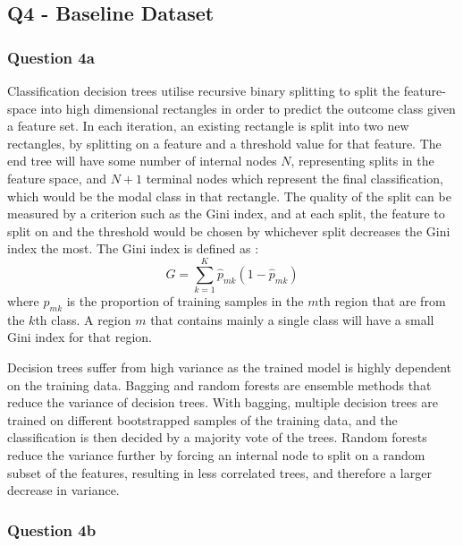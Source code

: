 
\subsection{Q4 - Baseline Dataset}\label{subsec:q4}
\subsubsection{Question 4a}\label{subsubsec:q4a}
    Classification decision trees utilise recursive binary splitting to split the feature-space into high dimensional
    rectangles in order to predict the outcome class given a feature set.
    In each iteration, an existing rectangle is split into two new rectangles, by splitting on a feature and a threshold
    value for that feature.
    The end tree will have some number of internal nodes $N$, representing splits in the feature space, and $N + 1$
    terminal nodes which represent the final classification, which would be the modal class in that rectangle.
    The quality of the split can be measured by a criterion such as the Gini index, and at each split, the feature to
    split on and the threshold would be chosen by whichever split decreases the Gini index the most.
    The Gini index is defined as \cite{ISL}:
    \begin{equation}
        G = \sum_{k=1}^{K} \hat{p}_{mk}(1 - \hat{p}_{mk})
        \label{eq:gini-index}
    \end{equation}
    where $\hat{p}_{mk}$ is the proportion of training samples in the $m$th region that are from the $k$th class.
    A region $m$ that contains mainly a single class will have a small Gini index for that region.

    Decision trees suffer from high variance as the trained model is highly dependent on the training data.
    Bagging and random forests are ensemble methods that reduce the variance of decision trees.
    With bagging, multiple decision trees are trained on different bootstrapped samples of the training data, and the
    classification is then decided by a majority vote of the trees.
    Random forests reduce the variance further by forcing an internal node to split on a random subset of the features,
    resulting in less correlated trees, and therefore a larger decrease in variance.

\subsubsection{Question 4b}\label{subsubsec:q4b}





